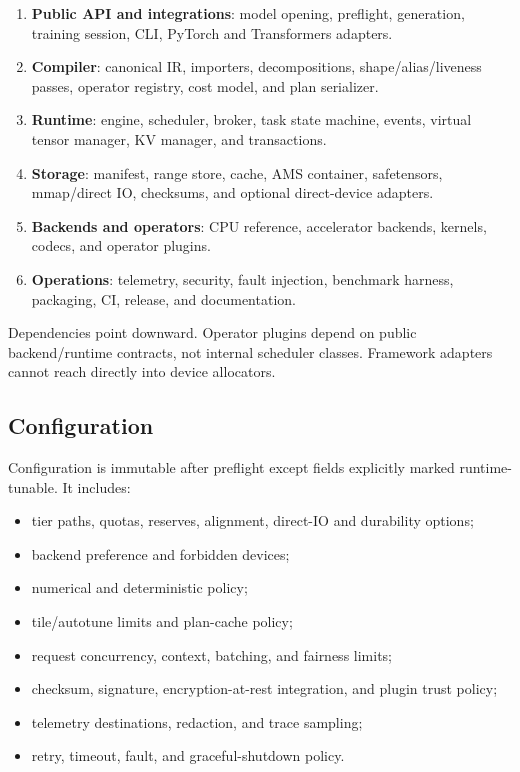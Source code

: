 \begin{enumerate}
  \item \textbf{Public API and integrations}: model opening, preflight, generation, training session, CLI, PyTorch and Transformers adapters.
  \item \textbf{Compiler}: canonical IR, importers, decompositions, shape/alias/liveness passes, operator registry, cost model, and plan serializer.
  \item \textbf{Runtime}: engine, scheduler, broker, task state machine, events, virtual tensor manager, KV manager, and transactions.
  \item \textbf{Storage}: manifest, range store, cache, AMS container, safetensors, mmap/direct IO, checksums, and optional direct-device adapters.
  \item \textbf{Backends and operators}: CPU reference, accelerator backends, kernels, codecs, and operator plugins.
  \item \textbf{Operations}: telemetry, security, fault injection, benchmark harness, packaging, CI, release, and documentation.
\end{enumerate}

Dependencies point downward. Operator plugins depend on public backend/runtime contracts, not internal scheduler classes. Framework adapters cannot reach directly into device allocators.

\subsection{Configuration}

Configuration is immutable after preflight except fields explicitly marked runtime-tunable. It includes:

\begin{itemize}
  \item tier paths, quotas, reserves, alignment, direct-IO and durability options;
  \item backend preference and forbidden devices;
  \item numerical and deterministic policy;
  \item tile/autotune limits and plan-cache policy;
  \item request concurrency, context, batching, and fairness limits;
  \item checksum, signature, encryption-at-rest integration, and plugin trust policy;
  \item telemetry destinations, redaction, and trace sampling;
  \item retry, timeout, fault, and graceful-shutdown policy.
\end{itemize}

